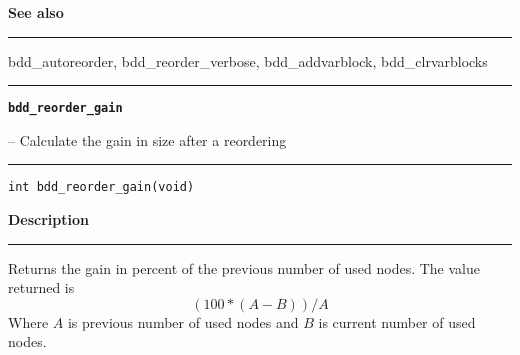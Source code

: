 \begin{minipage}{\textwidth}
\vspace{\parsep}\vspace{\baselineskip}\noindent
{\bf See also}\\\rule[1.5ex]{\textwidth}{0.2mm}\vspace{-1.5ex}
bdd\_autoreorder, bdd\_reorder\_verbose, bdd\_addvarblock, bdd\_clrvarblocks 
\end{minipage}
\vspace{8ex}
\begin{minipage}{\textwidth}

\noindent\begin{minipage}{\textwidth}
\rule{\textwidth}{0.5mm}
{\tt\bf bdd\_reorder\_gain }
\--- Calculate the gain in size after a reordering  \hspace{\fill}
\\\rule[1.5ex]{\textwidth}{0.5mm}
\end{minipage}

\noindent\begin{verbatim}
int bdd_reorder_gain(void) 
\end{verbatim}

\vspace{\parsep}\noindent
{\bf Description}\\\rule[1.5ex]{\textwidth}{0.2mm}\vspace{-1.5ex}\setlength{\parindent}{1em}
Returns the gain in percent of the previous number of used
           nodes. The value returned is
	   \[ (100 * (A - B)) / A \]
	   Where $A$ is previous number of used nodes and $B$ is current
	   number of used nodes.
	
\end{minipage}
\vspace{8ex}
